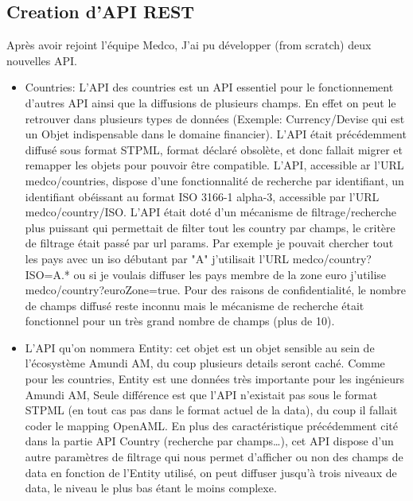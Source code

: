 \subsection{Creation d'API REST}
\par Après avoir rejoint l'équipe Medco, J'ai pu développer (from scratch) deux nouvelles API.\\
\begin{itemize}
    \item Countries: L'API des countries est un API essentiel pour le fonctionnement d'autres API ainsi que la diffusions de plusieurs champs. En effet on peut le retrouver dans plusieurs types de données (Exemple: Currency/Devise qui est un Objet indispensable dans le domaine financier). L'API était précédemment diffusé sous format STPML, format déclaré obsolète, et donc fallait migrer et remapper les objets pour pouvoir être compatible. L'API, accessible ar l'URL medco/countries, dispose d'une fonctionnalité de recherche par identifiant, un identifiant obéissant au format ISO 3166-1 alpha-3, accessible par l'URL medco/country/ISO. L'API était doté d'un mécanisme de filtrage/recherche plus puissant qui permettait de filter tout les country par champs, le critère de filtrage était passé par url params. Par exemple je pouvait chercher tout les pays avec un iso débutant par "A" j'utilisait l'URL medco/country?ISO=A.* ou si je voulais diffuser les pays membre de la zone euro j'utilise medco/country?euroZone=true. Pour des raisons de confidentialité, le nombre de champs diffusé reste inconnu mais le mécanisme de recherche était fonctionnel pour un très grand nombre de champs (plus de 10). \\
    \item L'API qu'on nommera Entity: cet objet est un objet sensible au sein de l'écosystème Amundi AM, du coup plusieurs details seront caché. Comme pour les countries, Entity est une données très importante pour les ingénieurs Amundi AM, Seule différence est que l'API n'existait pas sous le format STPML (en tout cas pas dans le format actuel de la data), du coup il fallait coder le mapping OpenAML. En plus des caractéristique précédemment cité dans la partie API Country (recherche par champs\dots), cet API dispose d'un autre paramètres de filtrage qui nous permet d'afficher ou non des champs de data en fonction de l'Entity utilisé, on peut diffuser jusqu'à trois niveaux de data, le niveau le plus bas étant le moins complexe. \\
\end{itemize}
